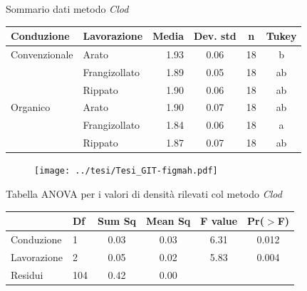\documentclass[10pt]{beamer}
\begin{document}






\begin{frame}{Sommario dati metodo \emph{Clod}}
  \footnotesize
  \begin{table}[ht]
    \centering
    \begin{tabular}{llrccc}
      \hline
      Conduzione & Lavorazione & Media & Dev. std & n & Tukey \\ 
      \hline
      Convenzionale & Arato & 1.93 & 0.06 &  18 & b \\ 
                 & Frangizollato & 1.89 & 0.05 &  18 & ab \\ 
                 & Rippato & 1.90 & 0.06 &  18 & ab \\ 
      Organico & Arato & 1.90 & 0.07 &  18 & ab \\ 
                 & Frangizollato & 1.84 & 0.06 &  18 & a \\ 
                 & Rippato & 1.87 & 0.07 &  18 & ab \\ 
      \hline
    \end{tabular}
    \label{tab:RiassuntoDensitaSpinta}
  \end{table}
\end{frame}

\begin{frame}
  \begin{figure}
    \texttt{[image: ../tesi/Tesi\_GIT-figmah.pdf]}
  \end{figure}
\end{frame}

\begin{frame}{Tabella ANOVA per i valori di densità rilevati col metodo \emph{Clod}}
  \begin{table}
    \centering
    \begin{tabular}{llcccc}
      \hline
      & Df & Sum Sq & Mean Sq & F value & Pr($>$F) \\ 
      \hline
      Conduzione & 1 & 0.03 & 0.03 & 6.31 & 0.012 \\ 
      Lavorazione & 2 & 0.05 & 0.02 & 5.83 & 0.004 \\ 
      Residui & 104 & 0.42 & 0.00 &  &  \\ 
      \hline
    \end{tabular}
    \label{tab:Anova densita per spinta}
  \end{table}
\end{frame}
\end{document}

